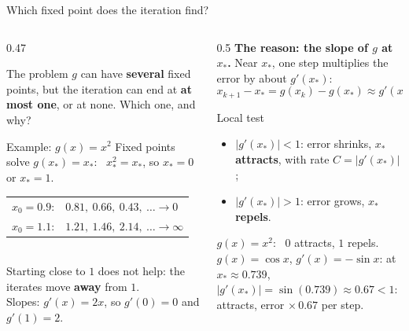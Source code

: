 \documentclass[aspectratio=169]{beamer}
\begin{document}
\begin{frame}{Which fixed point does the iteration find?}
\begin{columns}[T]
\begin{column}{0.47\textwidth}
\begin{block}{The problem}
\small $g$ can have \textbf{several} fixed points, but the iteration can end at \textbf{at most one}, or at none. Which one, and why?
\end{block}
\begin{exampleblock}{Example: $g(x) = x^2$}
\small Fixed points solve $g(x_\ast) = x_\ast$: \ $x_\ast^2 = x_\ast$, so $x_\ast = 0$ or $x_\ast = 1$.\\[3pt]
\footnotesize
\begin{tabular}{ll}
$x_0 = 0.9$: & $0.81,\ 0.66,\ 0.43,\ \ldots \to 0$ \\
$x_0 = 1.1$: & $1.21,\ 1.46,\ 2.14,\ \ldots \to \infty$
\end{tabular}\\[3pt]
Starting close to $1$ does not help: the iterates move \textbf{away} from $1$.\\[2pt]
Slopes: $g'(x) = 2x$, so $g'(0) = 0$ and $g'(1) = 2$.
\end{exampleblock}
\end{column}
\begin{column}{0.5\textwidth}
\small
\textbf{The reason: the slope of $g$ at $x_\ast$.} Near $x_\ast$, one step multiplies the error by about $g'(x_\ast)$:
\[
x_{k+1} - x_\ast = g(x_k) - g(x_\ast) \approx g'(x_\ast)\,(x_k - x_\ast).
\]
\begin{block}{Local test}
\begin{itemize}
  \item $|g'(x_\ast)| < 1$: error shrinks, $x_\ast$ \textbf{attracts}, with rate $C = |g'(x_\ast)|$;
  \item $|g'(x_\ast)| > 1$: error grows, $x_\ast$ \textbf{repels}.
\end{itemize}
\end{block}
\footnotesize $g(x) = x^2$: \ $0$ attracts, $1$ repels.\\[2pt]
$g(x) = \cos x$, $g'(x) = -\sin x$: at $x_\ast \approx 0.739$, $|g'(x_\ast)| = \sin(0.739) \approx 0.67 < 1$: attracts, error $\times\,0.67$ per step.
\end{column}
\end{columns}
\end{frame}

\end{document}
